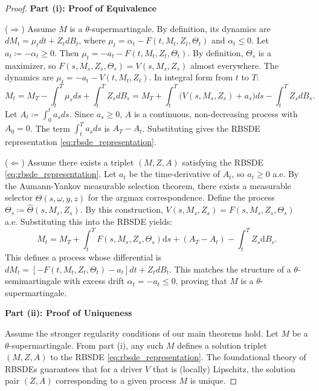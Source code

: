 \documentclass[12pt, letterpaper]{amsart}
\newcommand{\dd}{\mathrm{d}}
\theoremstyle{plain}
\theoremstyle{definition}
\theoremstyle{remark}
\numberwithin{equation}{section} %
\begin{document}
\begin{proof}
\noindent\textbf{Part (i): Proof of Equivalence}

\vspace{1ex}
\noindent($\Rightarrow$) Assume \(M\) is a \(\theta\)-supermartingale. By definition, its dynamics are \(dM_t = \mu_t dt + Z_t dB_t\), where \(\mu_t = \alpha_t - F(t,M_t,Z_t,\Theta_t)\) and \(\alpha_t \le 0\). Let \(a_t \coloneqq -\alpha_t \ge 0\). Then \(\mu_t = -a_t - F(t,M_t,Z_t,\Theta_t)\). By definition, \(\Theta_s\) is a maximizer, so \(F(s,M_s,Z_s,\Theta_s) = V(s,M_s,Z_s)\) almost everywhere. The dynamics are \(\mu_t = -a_t - V(t,M_t,Z_t)\). In integral form from $t$ to $T$:
\begin{equation}\label{eq:proof_decomp_integral}
    M_t = M_T - \int_t^T \mu_s ds + \int_t^T Z_s dB_s = M_T + \int_t^T \big( V(s,M_s,Z_s) + a_s \big) ds - \int_t^T Z_s dB_s.
\end{equation}
Let \(A_t \coloneqq \int_0^t a_s ds\). Since \(a_s \ge 0\), \(A\) is a continuous, non-decreasing process with \(A_0=0\). The term \(\int_t^T a_s ds\) is \(A_T - A_t\). Substituting gives the RBSDE representation \eqref{eq:rbsde_representation}.

\vspace{1ex}
\noindent($\Leftarrow$) Assume there exists a triplet \((M, Z, A)\) satisfying the RBSDE \eqref{eq:rbsde_representation}. Let \(a_t\) be the time-derivative of \(A_t\), so \(a_t \ge 0\) a.e. By the Aumann-Yankov measurable selection theorem, there exists a measurable selector \(\hat{\Theta}(s,\omega,y,z)\) for the argmax correspondence. Define the process \(\Theta_s \coloneqq \hat{\Theta}(s,M_s,Z_s)\). By this construction, \(V(s,M_s,Z_s) = F(s,M_s,Z_s,\Theta_s)\) a.e. Substituting this into the RBSDE yields:
\[
    M_t = M_T + \int_t^T F(s, M_s, Z_s, \Theta_s) \dd s + (A_T - A_t) - \int_t^T Z_s \dd B_s.
\]
This defines a process whose differential is \(dM_t = [-F(t,M_t,Z_t,\Theta_t) - a_t]dt + Z_t dB_t\). This matches the structure of a \(\theta\)-semimartingale with excess drift \(\alpha_t = -a_t \le 0\), proving that \(M\) is a \(\theta\)-supermartingale.

\vspace{1ex}
\noindent\textbf{Part (ii): Proof of Uniqueness}

Assume the stronger regularity conditions of our main theorems hold. Let \(M\) be a \(\theta\)-supermartingale. From part (i), any such \(M\) defines a solution triplet \((M, Z, A)\) to the RBSDE \eqref{eq:rbsde_representation}. The foundational theory of RBSDEs \cite{ElKaroui1997, Kobylanski2000} guarantees that for a driver \(V\) that is (locally) Lipschitz, the solution pair \((Z,A)\) corresponding to a given process \(M\) is unique.


\end{proof}
\end{document}
